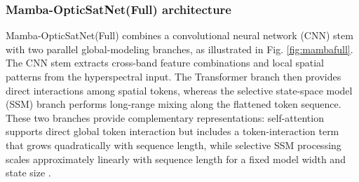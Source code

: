 \documentclass[a4paper,fleqn]{cas-dc}
\begin{document}
\subsubsection{Mamba-OpticSatNet(Full) architecture}
Mamba-OpticSatNet(Full) combines a convolutional neural network (CNN) stem with two parallel global-modeling branches, as illustrated in Fig. \ref{fig:mambafull}. The CNN stem extracts cross-band feature combinations and local spatial patterns from the hyperspectral input. The Transformer branch then provides direct interactions among spatial tokens, whereas the selective state-space model (SSM) branch performs long-range mixing along the flattened token sequence. These two branches provide complementary representations: self-attention supports direct global token interaction but includes a token-interaction term that grows quadratically with sequence length, while selective SSM processing scales approximately linearly with sequence length for a fixed model width and state size \cite{gu2022s4, gu2023mamba}.
\end{document}
